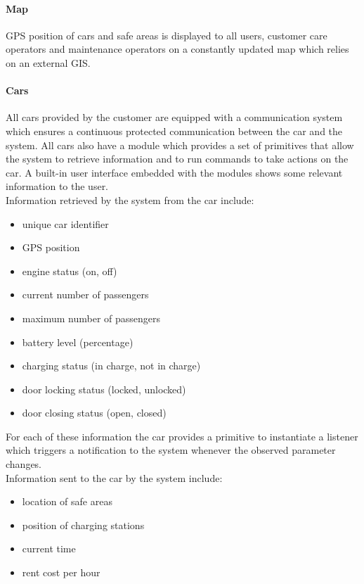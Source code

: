 	\paragraph{Map} GPS position of cars and safe areas is displayed to all users, customer care operators and maintenance operators on a constantly updated map which relies on an external GIS.

	\paragraph{Cars}\label{sec:cars}All cars provided by the customer are equipped with a communication system which ensures a continuous protected communication between the car and the system. All cars also have a module which provides a set of primitives that allow the system to retrieve information and to run commands to take actions on the car. A built-in user interface embedded with the modules shows some relevant information to the user.\\
	Information retrieved by the system from the car include:
	\begin{itemize}
		\item unique car identifier
		\item GPS position
		\item engine status (on, off)
		\item current number of passengers
		\item maximum number of passengers
		\item battery level (percentage)
		\item charging status (in charge, not in charge)
		\item door locking status (locked, unlocked)
		\item door closing status (open, closed)
	\end{itemize}
	For each of these information the car provides a primitive to instantiate a listener which triggers a notification to the system whenever the observed parameter changes.\\
\newline
	Information sent to the car by the system include:
	\begin{itemize}
		\item location of safe areas
		\item position of charging stations
		\item current time
		\item rent cost per hour
	\end{itemize}
